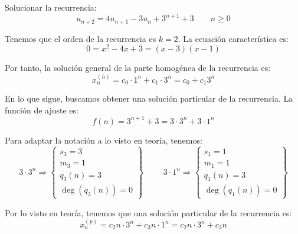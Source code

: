 \begin{ejercicio}
    Solucionar la recurrencia:
    \begin{equation*}
        u_{n+2} = 4u_{n+1} - 3u_n + 3^{n+1}+3 \qquad n\geq 0
    \end{equation*}

    Tenemos que el orden de la recurrencia es $k=2$. La ecuación característica es:
    \begin{equation*}
        0 = x^2 - 4x + 3 = (x-3)(x-1)
    \end{equation*}

    Por tanto, la solución general de la parte homogénea de la recurrencia es:
    \begin{equation*}
        x_n^{(h)} = c_0\cdot 1^n + c_1\cdot 3^n = c_0 + c_1 3^n
    \end{equation*}

    En lo que sigue, buscamos obtener una solución particular de la recurrencia. La función de ajuste es:
    \begin{equation*}
        f(n) = 3^{n+1} + 3 = 3\cdot 3^n + 3\cdot 1^n
    \end{equation*}

    Para adaptar la notación a lo visto en teoría, tenemos:
    \begin{equation*}
        3\cdot 3^n\Longrightarrow \left\{\begin{array}{l}
            s_3 = 3 \\
            m_3 = 1\\
            q_3(n) = 3 \\
            \deg(q_3(n)) = 0
        \end{array}\right\}
        \hspace{1cm}
        3\cdot 1^n\Longrightarrow \left\{\begin{array}{l}
            s_1 = 1 \\
            m_1 = 1\\
            q_1(n) = 3 \\
            \deg(q_1(n)) = 0
        \end{array}\right\}
    \end{equation*}

    Por lo visto en teoría, tenemos que una solución particular de la recurrencia es:
    \begin{equation*}
        x_n^{(p)} = c_2n\cdot 3^n + c_3n\cdot 1^n = c_2n\cdot 3^n + c_3n
    \end{equation*}


\end{ejercicio}

